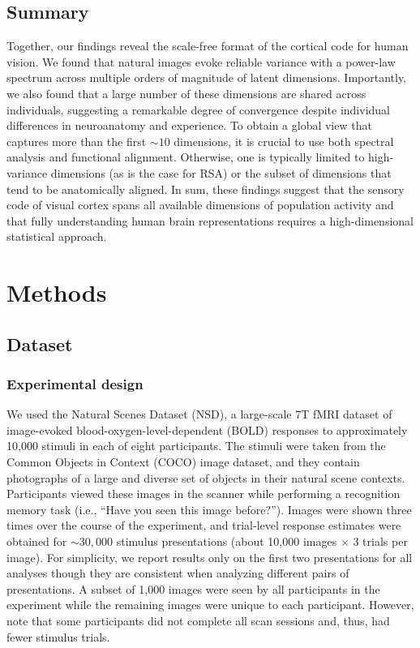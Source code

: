 \documentclass[10pt]{article}
\begin{document}
\subsection{Summary}\label{summary}

Together, our findings reveal the scale-free format of the cortical code for human vision. We found that natural images evoke reliable variance with a power-law spectrum across multiple orders of magnitude of latent dimensions. Importantly, we also found that a large number of these dimensions are shared across individuals, suggesting a remarkable degree of convergence despite individual differences in neuroanatomy and experience. To obtain a global view that captures more than the first \(\sim 10\) dimensions, it is crucial to use both spectral analysis and functional alignment. Otherwise, one is typically limited to high-variance dimensions (as is the case for RSA) or the subset of dimensions that tend to be anatomically aligned. In sum, these findings suggest that the sensory code of visual cortex spans all available dimensions of population activity and that fully understanding human brain representations requires a high-dimensional statistical approach.

\newpage

\section{Methods}\label{methods}

\subsection{Dataset}\label{dataset}

\subsubsection{Experimental design}\label{experimental-design}

We used the Natural Scenes Dataset (NSD), a large-scale 7T fMRI dataset of image-evoked blood-oxygen-level-dependent (BOLD) responses to approximately 10,000 stimuli in each of eight participants. The stimuli were taken from the Common Objects in Context (COCO) image dataset, and they contain photographs of a large and diverse set of objects in their natural scene contexts. Participants viewed these images in the scanner while performing a recognition memory task (i.e., ``Have you seen this image before?''). Images were shown three times over the course of the experiment, and trial-level response estimates were obtained for \(\sim 30,000\) stimulus presentations (about 10,000 images \(\times\) 3 trials per image). For simplicity, we report results only on the first two presentations for all analyses though they are consistent when analyzing different pairs of presentations. A subset of 1,000 images were seen by all participants in the experiment while the remaining images were unique to each participant. However, note that some participants did not complete all scan sessions and, thus, had fewer stimulus trials.
\end{document}
